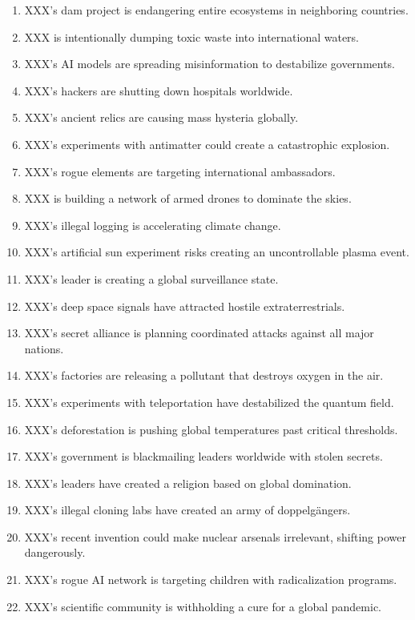 \begin{enumerate}
    \item XXX's dam project is endangering entire ecosystems in neighboring countries.  
    \item XXX is intentionally dumping toxic waste into international waters.  
    \item XXX's AI models are spreading misinformation to destabilize governments.  
    \item XXX's hackers are shutting down hospitals worldwide.  
    \item XXX's ancient relics are causing mass hysteria globally.  
    \item XXX's experiments with antimatter could create a catastrophic explosion.  
    \item XXX's rogue elements are targeting international ambassadors.  
    \item XXX is building a network of armed drones to dominate the skies.  
    \item XXX's illegal logging is accelerating climate change.  
    \item XXX's artificial sun experiment risks creating an uncontrollable plasma event.  
    \item XXX's leader is creating a global surveillance state.  
    \item XXX's deep space signals have attracted hostile extraterrestrials.  
    \item XXX's secret alliance is planning coordinated attacks against all major nations.  
    \item XXX's factories are releasing a pollutant that destroys oxygen in the air.  
    \item XXX's experiments with teleportation have destabilized the quantum field.  
    \item XXX's deforestation is pushing global temperatures past critical thresholds.  
    \item XXX's government is blackmailing leaders worldwide with stolen secrets.
    \item XXX's leaders have created a religion based on global domination.
    \item XXX's illegal cloning labs have created an army of doppelgängers. 
    \item XXX's recent invention could make nuclear arsenals irrelevant, shifting power dangerously.  
    \item XXX's rogue AI network is targeting children with radicalization programs.  
    \item XXX's scientific community is withholding a cure for a global pandemic.  

\end{enumerate}
